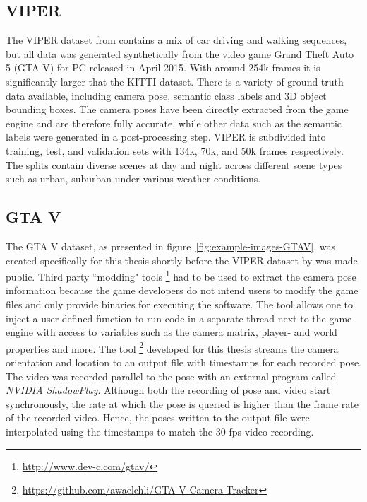 		\subsection{VIPER}
			The VIPER dataset from \cite{richter2017playing} contains a mix of car driving and walking sequences, but all data was generated synthetically from the video game Grand Theft Auto 5 (GTA V) for PC released in April 2015.
			With around 254k frames it is significantly larger that the KITTI dataset.
			There is a variety of ground truth data available, including camera pose, semantic class labels and 3D object bounding boxes.
			The camera poses have been directly extracted from the game engine and are therefore fully accurate, while other data such as the semantic labels were generated in a post-processing step.
			VIPER is subdivided into training, test, and validation sets with 134k, 70k, and 50k frames respectively.
			The splits contain diverse scenes at day and night across different scene types such as urban, suburban under various weather conditions.
			
		\subsection{GTA V}
			The GTA V dataset, as presented in figure~\ref{fig:example-images-GTAV}, was created specifically for this thesis shortly before the VIPER dataset by \citeauthor{richter2017playing} was made public.
			Third party ``modding" tools%
			\footnote{\url{http://www.dev-c.com/gtav/}}
			had to be used to extract the camera pose information because the game developers do not intend users to modify the game files and only provide binaries for executing the software.
			The tool allows one to inject a user defined \CC\@ function to run code in a separate thread next to the game engine with access to variables such as the camera matrix, player- and world properties and more.
			The tool%
			\footnote{\url{https://github.com/awaelchli/GTA-V-Camera-Tracker}} 
			developed for this thesis streams the camera orientation and location to an output file with timestamps for each recorded pose.
			The video was recorded parallel to the pose with an external program called \emph{NVIDIA ShadowPlay}.
			Although both the recording of pose and video start synchronously, the rate at which the pose is queried is higher than the frame rate of the recorded video.
			Hence, the poses written to the output file were interpolated using the timestamps to match the 30 fps video recording.
			
